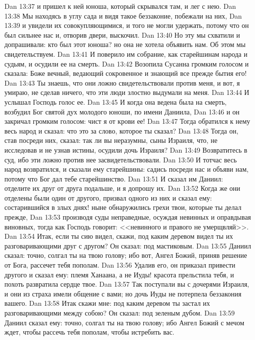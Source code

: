 \vs Dan 13:37 и пришел к ней юноша, который скрывался там, и лег с нею.
\vs Dan 13:38 Мы находясь в углу сада и видя такое беззаконие, побежали на них,
\vs Dan 13:39 и увидели их совокупляющимися, и того не могли удержать, потому что он был сильнее нас и, отворив двери, выскочил.
\vs Dan 13:40 Но эту мы схватили и допрашивали: кто был этот юноша? но она не хотела объявить нам. Об этом мы свидетельствуем.
\vs Dan 13:41 И поверило им собрание, как старейшинам народа и судьям, и осудили ее на смерть.
\rsbpar\vs Dan 13:42 Возопила Сусанна громким голосом и сказала: Боже вечный, ведающий сокровенное и знающий все прежде бытия его!
\vs Dan 13:43 Ты знаешь, что они ложно свидетельствовали против меня, и вот, я умираю, не сделав ничего, что эти люди злостно выдумали на меня.
\vs Dan 13:44 И услышал Господь голос ее.
\vs Dan 13:45 И когда она ведена была на смерть, возбудил Бог святой дух молодого юноши, по имени Даниила,
\vs Dan 13:46 и он закричал громким голосом: чист я от крови ее!
\vs Dan 13:47 Тогда обратился к нему весь народ и сказал: что это за слово, которое ты сказал?
\vs Dan 13:48 Тогда он, став посреди них, сказал: так ли вы неразумны, сыны Израиля, что, не исследовав и не узнав истины, осудили дочь Израиля?
\vs Dan 13:49 Возвратитесь в суд, ибо эти ложно против нее засвидетельствовали.
\vs Dan 13:50 И тотчас весь народ возвратился, и сказали ему старейшины: садись посреди нас и объяви нам, потому что Бог дал тебе старейшинство.
\vs Dan 13:51 И сказал им Даниил: отделите их друг от друга подальше, и я допрошу их.
\vs Dan 13:52 Когда же они отделены были один от другого, призвал одного из них и сказал ему: состарившийся в злых днях! ныне обнаружились грехи твои, которые ты делал прежде,
\vs Dan 13:53 производя суды неправедные, осуждая невинных и оправдывая виновных, тогда как Господь говорит: <<невинного и правого не умерщвляй>>.
\vs Dan 13:54 Итак, если ты сию видел, скажи, под каким деревом видел ты их разговаривающими друг с другом? Он сказал: под мастиковым.
\vs Dan 13:55 Даниил сказал: точно, солгал ты на твою голову; ибо вот, Ангел Божий, приняв решение от Бога, рассечет тебя пополам.
\vs Dan 13:56 Удалив его, он приказал привести другого и сказал ему: племя Ханаана, а не Иуды! красота прельстила тебя, и похоть развратила сердце твое.
\vs Dan 13:57 Так поступали вы с дочерями Израиля, и они из страха имели общение с вами; но дочь Иуды не потерпела беззакония вашего.
\vs Dan 13:58 Итак скажи мне: под каким деревом ты застал их разговаривающими между собою? Он сказал: под зеленым дубом.
\vs Dan 13:59 Даниил сказал ему: точно, солгал ты на твою голову; ибо Ангел Божий с мечом ждет, чтобы рассечь тебя пополам, чтобы истребить вас.
